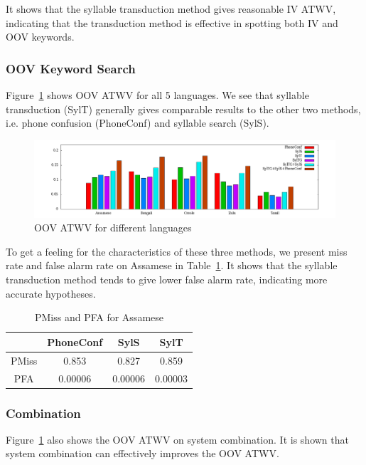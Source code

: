 \documentclass[journal]{IEEEtran}
\begin{document}
It shows that the syllable transduction method gives reasonable IV ATWV, indicating that the 
transduction method is effective in spotting both IV and OOV keywords.

\subsubsection{OOV Keyword Search}
Figure~\ref{fig:atwvoov} shows OOV ATWV for all 5 languages. We see that syllable transduction (SylT) 
generally gives comparable results to the other two methods, i.e. phone confusion (PhoneConf) and syllable search (SylS).

\begin{figure}[!t]
  \centering
  \includegraphics[width=1.00\textwidth, height=0.25\textwidth]{histall.png}
  \caption{OOV ATWV for different languages}
  \label{fig:atwvoov}
\end{figure}

To get a feeling for the characteristics of these three methods, we present miss rate and false alarm rate on Assamese
in Table~\ref{tab:Miss}. It shows that the syllable transduction method tends to give lower false alarm rate, indicating
more accurate hypotheses.
\begin{table}[!t]
  \caption{PMiss and PFA for Assamese}
  \label{tab:Miss}
  \centering
  \begin{tabular}{cccc}
    \hline
              & PhoneConf & SylS  & SylT  \\
    \hline
    PMiss     & 0.853     & 0.827 & 0.859 \\
    PFA       & 0.00006   & 0.00006 & 0.00003 \\
    \hline
  \end{tabular}
\end{table}

\subsubsection{Combination}
Figure~\ref{fig:atwvoov} also shows the OOV ATWV on system combination. It is shown that system combination can effectively
improves the OOV ATWV.
\end{document}
